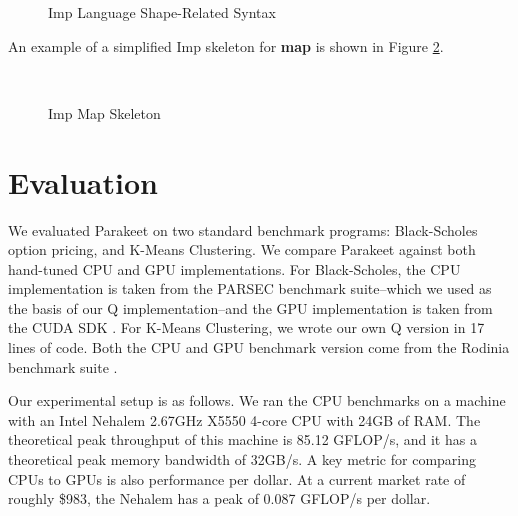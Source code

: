 \documentclass[preprint]{sigplanconf}
\begin{document}
\begin{figure}
\begin{tabular}{| m{0.1cm}m{1.2cm}m{0.1cm}m{0.2cm}p{2cm}p{2.4cm} |}
& & & & &\\
\hline
\end{tabular}
\caption{Imp Language Shape-Related Syntax}
\label{ImpSyntax}
\end{figure}

An example of a simplified Imp skeleton for \textbf{map} is shown in Figure
\ref{ImpMap}.

\begin{figure}[h!]
  \begin{lstlisting}[numbers=none]
    
  \end{lstlisting}
  \caption{Imp Map Skeleton}
  \label{ImpMap}
\end{figure}

\section{Evaluation}
\label{Evaluation}

We evaluated Parakeet on two standard benchmark programs: Black-Scholes option
pricing, and K-Means Clustering.  We compare Parakeet against both hand-tuned
CPU and GPU implementations.  For Black-Scholes, the CPU implementation is
taken from the PARSEC \cite{Bien08} benchmark suite--which we used as the basis
of our Q implementation--and the GPU implementation is taken from the CUDA SDK
\cite{NvidSD}.  For K-Means Clustering, we wrote our own Q version in 17 lines
of code.  Both the CPU and GPU benchmark version come from the Rodinia
benchmark suite \cite{Che09}.

Our experimental setup is as follows.  We ran the CPU benchmarks on a machine
with an Intel Nehalem 2.67GHz X5550 4-core CPU with 24GB of RAM.  The
theoretical peak throughput of this machine is 85.12 GFLOP/s, and it has a
theoretical peak memory bandwidth of 32GB/s.  A key metric for comparing CPUs
to GPUs is also performance per dollar.  At a current market rate of roughly
\$983, the Nehalem has a peak of 0.087 GFLOP/s per dollar.
\end{document}
